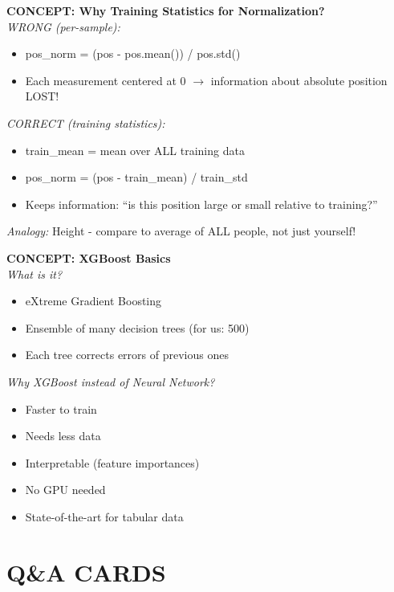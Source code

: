 \documentclass[a4paper,10pt]{article}
\begin{document}
\begin{mdframed}[style=konzept]
\textbf{CONCEPT: Why Training Statistics for Normalization?}\\[5pt]
\textit{WRONG (per-sample):}
\begin{itemize}[leftmargin=*, nosep]
    \item pos\_norm = (pos - pos.mean()) / pos.std()
    \item Each measurement centered at 0 $\rightarrow$ information about absolute position LOST!
\end{itemize}
\textit{CORRECT (training statistics):}
\begin{itemize}[leftmargin=*, nosep]
    \item train\_mean = mean over ALL training data
    \item pos\_norm = (pos - train\_mean) / train\_std
    \item Keeps information: ``is this position large or small relative to training?''
\end{itemize}
\textit{Analogy:} Height - compare to average of ALL people, not just yourself!
\end{mdframed}

\begin{mdframed}[style=konzept]
\textbf{CONCEPT: XGBoost Basics}\\[5pt]
\textit{What is it?}
\begin{itemize}[leftmargin=*, nosep]
    \item eXtreme Gradient Boosting
    \item Ensemble of many decision trees (for us: 500)
    \item Each tree corrects errors of previous ones
\end{itemize}
\textit{Why XGBoost instead of Neural Network?}
\begin{itemize}[leftmargin=*, nosep]
    \item Faster to train
    \item Needs less data
    \item Interpretable (feature importances)
    \item No GPU needed
    \item State-of-the-art for tabular data
\end{itemize}
\end{mdframed}

\newpage

\section*{Q\&A CARDS}
\end{document}
